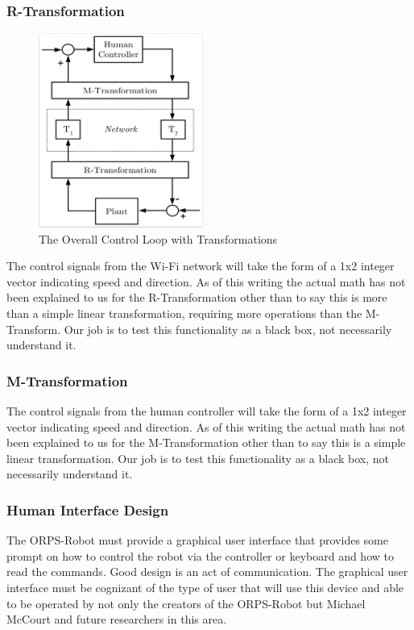 \documentclass[english,12pt]{article}
\begin{document}
\subsubsection{R-Transformation}
\begin{figure}
    \vspace{-20pt}
    \begin{center}
      \includegraphics[width=0.48\textwidth]{ovr_tran.jpg}
    \end{center}
    \vspace{-20pt}
    \caption{The Overall Control Loop with Transformations}
    \vspace{-10pt}
  \end{figure}
The control signals from the Wi-Fi network will take the
form of a 1x2 integer vector indicating speed and
direction. As of this writing the actual math has not been
explained to us for the R-Transformation other than to
say this is more than a simple linear transformation,
requiring more operations than the M-Transform. Our job
is to test this functionality as a black box, not necessarily
understand it.
\subsubsection{M-Transformation}
The control signals from the human controller will take
the form of a 1x2 integer vector indicating speed and
direction. As of this writing the actual math has not been
explained to us for the M-Transformation other than to
say this is a simple linear transformation. Our job is to
test this functionality as a black box, not necessarily
understand it.
\subsubsection{Human Interface Design}
The ORPS-Robot must provide a graphical user interface
that provides some prompt on how to control the robot via
the controller or keyboard and how to read the commands. Good design is an act of communication.
The graphical user interface must be cognizant of the type of user that will use this device and able to be
operated by not only the creators of the ORPS-Robot but Michael McCourt and future researchers in this
area.
\end{document}
